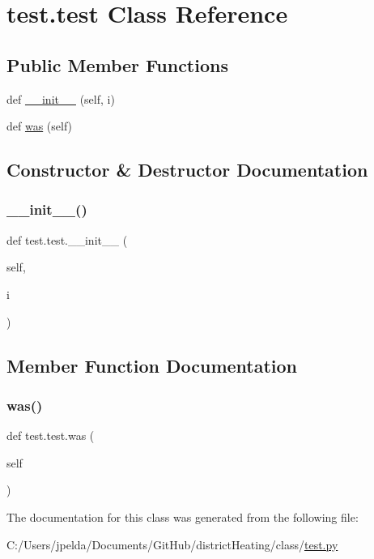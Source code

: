 \hypertarget{classtest_1_1test}{}\section{test.\+test Class Reference}
\label{classtest_1_1test}
\subsection*{Public Member Functions}
\begin{DoxyCompactItemize}
\item 
def \hyperlink{classtest_1_1test_a275ac6c39676eb81c64f165c9f9b2467}{\+\_\+\+\_\+init\+\_\+\+\_\+} (self, i)
\item 
def \hyperlink{classtest_1_1test_adee84dc04b4a15e8946ec05846a00d48}{was} (self)
\end{DoxyCompactItemize}


\subsection{Constructor \& Destructor Documentation}
\mbox{\label{classtest_1_1test_a275ac6c39676eb81c64f165c9f9b2467}} 
\subsubsection{\texorpdfstring{\+\_\+\+\_\+init\+\_\+\+\_\+()}{\_\_init\_\_()}}
{\footnotesize\ttfamily def test.\+test.\+\_\+\+\_\+init\+\_\+\+\_\+ (\begin{DoxyParamCaption}\item[{}]{self,  }\item[{}]{i }\end{DoxyParamCaption})}



\subsection{Member Function Documentation}
\mbox{\label{classtest_1_1test_adee84dc04b4a15e8946ec05846a00d48}} 
\subsubsection{\texorpdfstring{was()}{was()}}
{\footnotesize\ttfamily def test.\+test.\+was (\begin{DoxyParamCaption}\item[{}]{self }\end{DoxyParamCaption})}



The documentation for this class was generated from the following file\+:\begin{DoxyCompactItemize}
\item 
C\+:/\+Users/jpelda/\+Documents/\+Git\+Hub/district\+Heating/class/\hyperlink{test_8py}{test.\+py}\end{DoxyCompactItemize}
